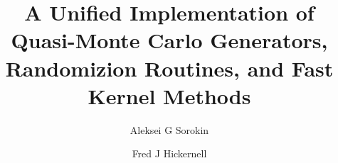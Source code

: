 \documentclass[acmsmall]{acmart}
\begin{document}
\title{A Unified Implementation of Quasi-Monte Carlo Generators, Randomizion Routines, and Fast Kernel Methods}

\author{Aleksei G Sorokin}
\author{Fred J Hickernell}


\end{document}
